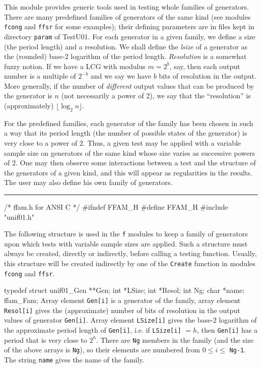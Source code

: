 
This module provides generic tools used in testing whole families of
generators. There are many predefined families of generators of the same
kind (see modules {\tt fcong} and {\tt ffsr} for some examples);
 their defining parameters are in files kept in directory {\tt param}
of TestU01. For each generator in a given family, we define a
size (the period length) and a resolution. We shall define
the {\it lsize} of a generator as the (rounded) base-2 logarithm of the 
period length. \emph{Resolution} is a somewhat fuzzy notion.
If we have a LCG with modulus $m = 2^b$, say, then each output number
is a multiple of $2^{-b}$ and we say we have $b$ bits of resolution
in the output.  
More generally, if the number of \emph{different} output values 
that can be produced
by the generator is $n$ (not necessarily a power of 2), we say that
the ``resolution'' is (approximately) $\lfloor\log_2 n\rfloor$.


For the predefined families, each generator of the family has been chosen 
in such a way that its period length (the number of possible states of the
generator) is very close to a power of 2. Thus, a given test may be applied
with a variable sample size on generators of the same kind whose size
varies as successive powers of 2. One may then observe some interactions
between a test and the structure of the generators of a given kind, and this
will appear as regularities in the results.
The user may also define his own family of generators.

\bigskip
\hrule
\code\hide
/* ffam.h  for ANSI C */
#ifndef FFAM_H
#define FFAM_H
\endhide
#include "unif01.h"
\endcode



The following structure is used in the {\tt f} modules
to keep a family of generators upon which tests with variable sample
sizes are applied. Such a structure must always be created, directly or
indirectly, before calling a testing function. Usually, this structure will
be created indirectly by one of the {\tt Create} function in modules
{\tt fcong} and {\tt ffsr}.
 
\code


typedef struct {
   unif01_Gen **Gen;
   int *LSize;
   int *Resol;
   int Ng;
   char *name;
} ffam_Fam;
\endcode
\tab  Array element {\tt Gen[i]} is a generator of
  the family, array element {\tt Resol[i]} gives the (approximate) number
  of bits of resolution in the output values of generator {\tt Gen[i]}.
  Array element {\tt LSize[i]} gives the base-2 logarithm of the approximate
  period length of {\tt Gen[i]}, i.e. if {\tt LSize[i]} $= h$, then
  {\tt Gen[i]} has a period that is very close to $2^h$. There are {\tt Ng}
  members in the family (and the size of the above arrays is 
  {\tt Ng}), so their elements are numbered from $0 \le i \le$ {\tt Ng-1}.
  The string {\tt name} gives the name of the family.
\endtab
\code


